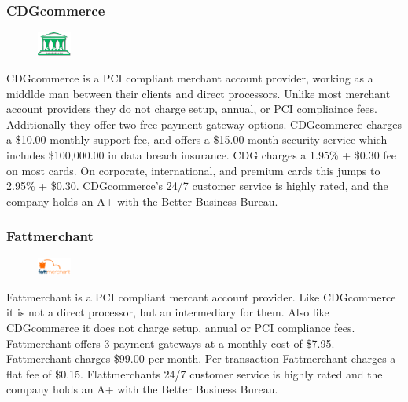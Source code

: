 \documentclass[letterpaper]{article}
\begin{document}
      \subsubsection{CDGcommerce}
        \begin{figure}
          \centering
          \includegraphics[width=0.1\textwidth]{cdgcommerce-logo}
        \end{figure}
        CDGcommerce is a PCI compliant merchant account provider, working as a middlde man between their clients and direct processors.
        Unlike most merchant account providers they do not charge setup, annual, or PCI compliaince fees. Additionally they
        offer two free payment gateway options. CDGcommerce charges a \$10.00 monthly support fee, and offers a \$15.00 month security service which includes
        \$100,000.00 in data breach insurance. CDG charges a 1.95\% + \$0.30 fee on most cards. On corporate, international, and premium cards this jumps to
        2.95\% + \$0.30. CDGcommerce's 24/7 customer service is highly rated, and the company holds an A+ with the Better Business Bureau.
      \subsubsection{Fattmerchant}
      \begin{figure}
        \centering
        \includegraphics[width=0.1\textwidth]{fattmerchant}
      \end{figure}
        Fattmerchant is a PCI compliant mercant account provider. Like CDGcommerce it is not a direct processor, but an intermediary for them.
        Also like CDGcommerce it does not charge setup, annual or PCI compliance fees. Fattmerchant offers 3 payment gateways at a monthly cost of \$7.95.
        Fattmerchant charges \$99.00 per month. Per transaction Fattmerchant charges a flat fee of \$0.15. Flattmerchants 24/7 customer service is highly rated
        and the company holds an A+ with the Better Business Bureau.
\end{document}
